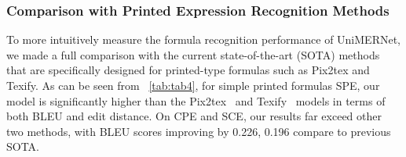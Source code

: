 \documentclass[runningheads]{llncs}
\begin{document}
\subsubsection{Comparison with Printed Expression Recognition Methods}

To more intuitively measure the formula recognition performance of UniMERNet, we made a full comparison with the current state-of-the-art (SOTA) methods that are specifically designed for printed-type formulas such as Pix2tex and Texify. As can be seen from ~\cref{tab:tab4}, for simple printed formulas SPE, our model is significantly higher than the Pix2tex~\cite{pix2tex2022} and Texify~\cite{texify2023} models in terms of both BLEU and edit distance. On CPE and SCE, our results far exceed other two methods, with BLEU scores improving by 0.226, 0.196 compare to previous SOTA.
\end{document}
